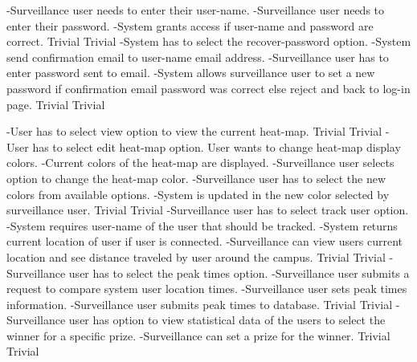  		{-Surveillance user needs to enter their user-name.
 		-Surveillance user needs to enter their password.
 		-System grants access if user-name and password are correct.}
 		 {Trivial}
		 {Trivial}
 		{-System has to select the recover-password option.
 		-System send confirmation email to user-name email address.
		-Surveillance user has to enter password sent to email.
	  	-System allows surveillance user to set a new password if confirmation email password was correct 			 else reject and back to log-in page.}
	  	 {Trivial}
		 {Trivial}

		{-User has to select view option to view the current heat-map.}
		 {Trivial}
		 {Trivial}
		{-User has to select edit heat-map option.
		 {User wants to change heat-map display colors.}
		{-Current colors of the heat-map are displayed.
		-Surveillance user selects option to change the heat-map color.
		-Surveillance user has to select the new colors from available options.
		-System is updated in the new color selected by surveillance user.}	
		}
		 {Trivial}
		 {Trivial}	
		{-Surveillance user has to select track user option.
		-System requires user-name of the user that should be tracked.
		-System returns current location of user if user is connected.
		-Surveillance can view users current location and see distance traveled by user around the campus.}
		 {Trivial}
		 {Trivial}
		{-Surveillance user has to select the peak times option.
		-Surveillance user submits a request to compare system user location times.
		-Surveillance user sets peak times information.
		-Surveillance user submits peak times to database.}
		 {Trivial}
		 {Trivial}
		{-Surveillance user has option to view statistical data of the users to select the winner for a specific prize.
		 -Surveillance can set a prize for the winner.}
		 {Trivial}
		 {Trivial}
